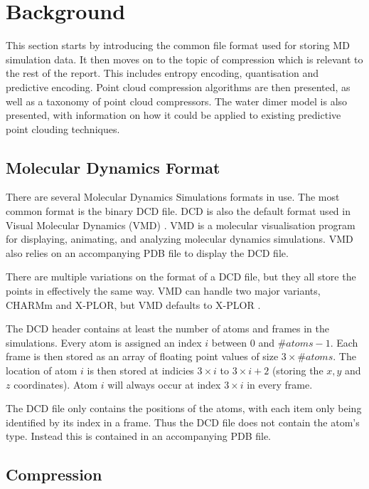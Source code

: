 \documentclass[a4paper]{report}
\begin{document}
\chapter{Background}

This section starts by introducing the common file format used for storing MD
simulation data. It then moves on to the topic of compression which is
relevant to the rest of the report. This includes entropy encoding,
quantisation and predictive encoding. Point cloud compression algorithms are
then presented, as well as a taxonomy of point cloud compressors. The water
dimer model is also presented, with information on how it could be applied to
existing predictive point clouding techniques.

\section{Molecular Dynamics Format}
\label{sec:molec-dynam-form}

There are several Molecular Dynamics Simulations formats in use. The most
common format is the binary DCD file. DCD is also the default format used in
Visual Molecular Dynamics (VMD) \citep{vmd}. VMD is a molecular visualisation
program for displaying, animating, and analyzing molecular dynamics
simulations. VMD also relies on an accompanying PDB file to display the DCD
file.

There are multiple variations on the format of a DCD file, but they all store
the points in effectively the same way. VMD can handle two major variants,
CHARMm and X-PLOR, but VMD defaults to X-PLOR \citep{vmddcdformat}.

The DCD header contains at least the number of atoms and frames in the
simulations. Every atom is assigned an index $i$ between $0$ and $\#atoms -
1$. Each frame is then stored as an array of floating point values of size $3
\times \#atoms$. The location of atom $i$ is then stored at indicies $3 \times
i$ to $3 \times i + 2$ (storing the $x, y$ and $z$ coordinates). Atom $i$ will
always occur at index $3 \times i$ in every frame.

The DCD file only contains the positions of the atoms, with each item only
being identified by its index in a frame. Thus the DCD file does not contain
the atom's type. Instead this is contained in an accompanying PDB file.


\section{Compression}
\end{document}
